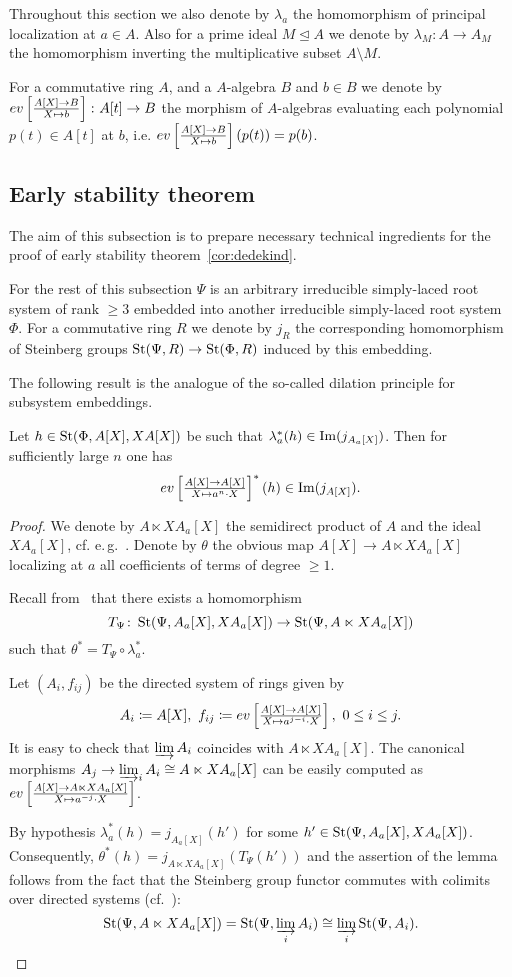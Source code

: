Throughout this section we also denote by $\lambda_a$ the homomorphism of principal localization at $a \in A$.
Also for a prime ideal $M \trianglelefteq A$ we denote by $\lambda_M \colon A \to A_M$ the homomorphism inverting the multiplicative subset $A \setminus M$.

For a commutative ring $A$, and a $A$-algebra $B$ and $b\in B$ we denote by $ev \textstyle \left[\frac{A[X] \rightarrow B}{X \mapsto b}\right]\colon A[t]\rightarrow B$ the morphism of $A$-algebras evaluating each polynomial
 $p(t)\in A[t]$ at $b$, i.e. $ev \textstyle \left[\frac{A[X] \rightarrow B}{X \mapsto b}\right] (p(t)) = p(b)$.
\subsection{Early stability theorem}
The aim of this subsection is to prepare necessary technical ingredients for the proof of early stability theorem~\cref{cor:dedekind}.

For the rest of this subsection $\Psi$ is an arbitrary irreducible simply-laced root system of rank $\geq 3$ embedded into another irreducible simply-laced root system $\Phi$.
For a commutative ring $R$ we denote by $j_R$ the corresponding homomorphism of Steinberg groups $\operatorname{St}(\Psi, R) \to \operatorname{St}(\Phi, R)$ induced by this embedding.

The following result is the analogue of the so-called dilation principle for subsystem embeddings.
\begin{lemma}\label{lem:dp-2}
Let $h\in\operatorname{St}(\Phi, A[X], X A[X])$ be such that $\lambda_a^*(h) \in \operatorname{Im}(j_{A_a[X]})$.
Then for sufficiently large $n$ one has
\[ev \textstyle \left[\frac{A[X] \rightarrow A[X]}{X \mapsto a^n\cdot X}\right]^*(h) \in \mathrm{Im}(j_{A[X]}).\]
\end{lemma}
\begin{proof}
 We denote by $A\ltimes XA_a[X]$ the semidirect product of $A$ and the ideal $XA_a[X]$, cf. e.\,g.~\cite[Definition~3.2]{S15}.
 Denote by $\theta$ the obvious map $A[X]\rightarrow A\ltimes XA_a[X]$ localizing at $a$ all coefficients of terms of degree $\geq 1$.

 Recall from~\cite[\S~2]{LS17} that there exists a homomorphism
 \[T_\Psi \colon \operatorname{St}(\Psi, A_a[X], XA_a[X]) \to \operatorname{St}(\Psi, A \ltimes XA_a[X])\]
 such that $\theta^* = T_\Psi \circ \lambda_a^*$.

 Let $(A_i, f_{ij})$ be the directed system of rings given by
 \[A_i\coloneqq A[X],\ f_{ij} \coloneqq ev \textstyle \left[\frac{A[X] \rightarrow A[X]}{X \mapsto a^{j-i} \cdot X}\right],\ 0 \leq i\leq j.\]
 It is easy to check that $\varinjlim A_i$ coincides with $A \ltimes XA_a[X]$.
 The canonical morphisms $A_j\rightarrow \varinjlim_i A_i \cong A \ltimes XA_a[X]$ can be easily computed as $ev \textstyle \left[\frac{A[X] \rightarrow A\ltimes XA_a[X]}{X \mapsto a^{-j} \cdot X}\right]$.

 By hypothesis $\lambda_a^*(h) = j_{A_a[X]}(h')$ for some $h' \in \operatorname{St}(\Psi, A_a[X], XA_a[X])$.
 Consequently, $\theta^*(h) = j_{A \ltimes XA_a[X]}(T_\Psi(h'))$
 and the assertion of the lemma follows from the fact that the Steinberg group functor commutes with
  colimits over directed systems (cf.~\cite[Lemma~2.2]{Tu83}):
 \[\operatorname{St}(\Psi, A\ltimes XA_a[X]) = \operatorname{St}(\Psi, \varinjlim_i A_i) \cong \varinjlim_i \operatorname{St}(\Psi,A_i). \qedhere\]
\end{proof}

